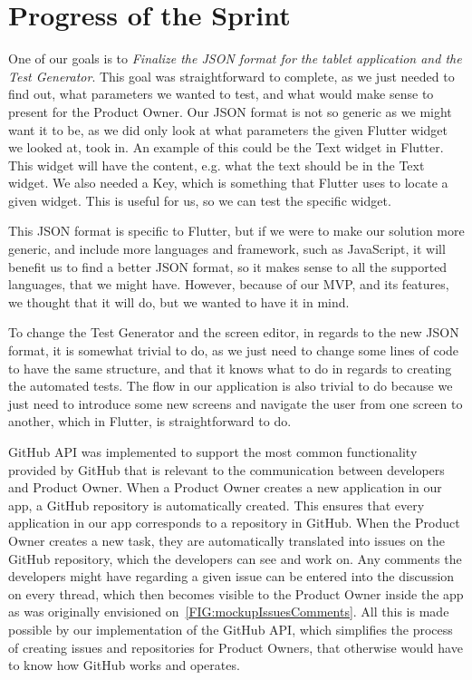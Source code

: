 \section{Progress of the Sprint}
One of our goals is to \textit{Finalize the JSON format for the tablet application and the Test Generator}.
This goal was straightforward to complete, as we just needed to find out, what parameters we wanted to test, and what would make sense to present for the Product Owner.
Our JSON format is not so generic as we might want it to be, as we did only look at what parameters the given Flutter widget we looked at, took in.
An example of this could be the Text widget in Flutter.
This widget will have the content, e.g. what the text should be in the Text widget.
We also needed a Key, which is something that Flutter uses to locate a given widget.
This is useful for us, so we can test the specific widget.

This JSON format is specific to Flutter, but if we were to make our solution more generic, and include more languages and framework, such as JavaScript, it will benefit us to find a better JSON format, so it makes sense to all the supported languages, that we might have.
However, because of our MVP, and its features, we thought that it will do, but we wanted to have it in mind.

To change the Test Generator and the screen editor, in regards to the new JSON format, it is somewhat trivial to do, as we just need to change some lines of code to have the same structure, and that it knows what to do in regards to creating the automated tests.
The flow in our application is also trivial to do because we just need to introduce some new screens and navigate the user from one screen to another, which in Flutter, is straightforward to do.

GitHub API was implemented to support the most common functionality provided by GitHub that is relevant to the communication between developers and Product Owner.
When a Product Owner creates a new application in our app, a GitHub repository is automatically created.
This ensures that every application in our app corresponds to a repository in GitHub. 
When the Product Owner creates a new task, they are automatically translated into issues on the GitHub repository, which the developers can see and work on. 
Any comments the developers might have regarding a given issue can be entered into the discussion on every thread, which then becomes visible to the Product Owner inside the app as was originally envisioned on~\autoref{FIG:mockupIssuesComments}.
All this is made possible by our implementation of the GitHub API, which simplifies the process of creating issues and repositories for Product Owners, that otherwise would have to know how GitHub works and operates.